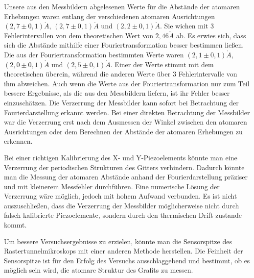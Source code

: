\documentclass[10pt,a4paper]{article}
\begin{document}
Unsere aus den Messbildern abgelesenen Werte für die Abstände der atomaren Erhebungen waren entlang der verschiedenen atomaren Ausrichtungen $(2,7 \pm 0,1) \mathring{A}$, $(2,7 \pm 0,1) \mathring{A}$ und $(2,2 \pm 0,1) \mathring{A}$. Sie wichen mit 3 Fehlerintervallen von dem theoretischen Wert von $2,46 \mathring{A}$ ab. Es erwies sich, dass sich die Abstände mithilfe einer Fouriertransformation besser bestimmen ließen. Die aus der Fouriertransformation bestimmten Werte waren $(2,1\pm0,1)\mathring{A}$, $(2,0\pm0,1)\mathring{A}$ und $(2,5\pm0,1)\mathring{A}$. Einer der Werte stimmt mit dem theoretischen überein, während die anderen Werte über 3 Fehlerintervalle von ihm abweichen.
 Auch wenn die Werte aus der Fouriertransformation nur zum Teil bessere Ergebnisse, als die aus den Messbildern liefern, ist ihr Fehler besser einzuschätzen. Die Verzerrung der Messbilder kann sofort bei Betrachtung der Fourierdarstellung erkannt werden. Bei einer direkten Betrachtung der Messbilder war die Verzerrung erst nach dem Ausmessen der Winkel zwischen den atomaren Ausrichtungen oder dem Berechnen der Abstände der atomaren Erhebungen zu erkennen.

Bei einer richtigen Kalibrierung des X- und Y-Piezoelements könnte man eine Verzerrung der periodischen Strukturen des Gitters verhindern. Dadurch könnte man die Messung der atomaren Abstände anhand der Fourierdarstellung präziser und mit kleinerem Messfehler durchführen. Eine numerische Lösung der Verzerrung wäre möglich, jedoch mit hohem Aufwand verbunden.
Es ist nicht auszuschließen, dass die Verzerrung der Messbilder möglicherweise nicht durch falsch kalibrierte Piezoelemente, sondern durch den thermischen Drift zustande kommt.

Um bessere Versuchsergebnisse zu erzielen, könnte man die Sensorspitze des Rastertunnelmikroskops mit einer anderen Methode herstellen. Die Feinheit der Sensorspitze ist für den Erfolg des Versuchs ausschlaggebend und bestimmt, ob es möglich sein wird, die atomare Struktur des Grafits zu messen.
\end{document}
